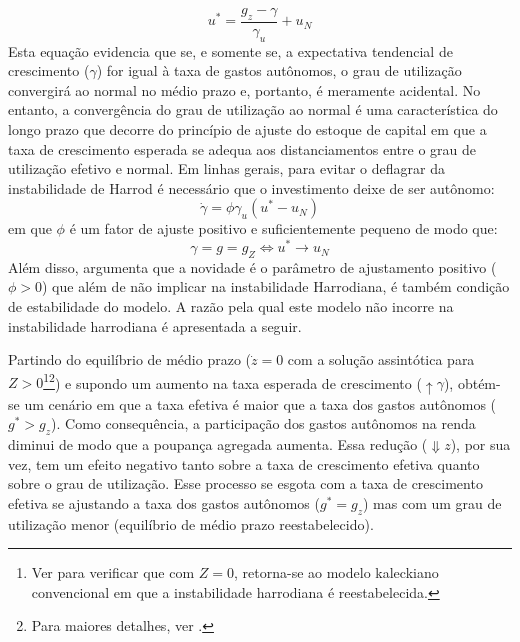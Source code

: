 \begin{equation}
u^* = \frac{g_z - \gamma}{\gamma_u} + u_N
\end{equation}
Esta equação evidencia que se, e somente se, a expectativa tendencial de crescimento ($\gamma$) for igual à taxa de gastos autônomos, o grau de utilização convergirá ao normal no médio prazo e, portanto, é meramente acidental. No entanto, a convergência do grau de utilização ao normal é uma característica do longo prazo que decorre do princípio de ajuste do estoque de capital em que a taxa de crescimento esperada se adequa aos distanciamentos entre o grau de utilização efetivo e normal. Em linhas gerais, para evitar o deflagrar da instabilidade de Harrod é necessário que o investimento deixe de ser autônomo: 
\begin{equation}
\label{eqAllain}
    \dot \gamma = \phi\gamma_u(u^* - u_N)
\end{equation}
em que $\phi$ é um fator de ajuste positivo e suficientemente pequeno de modo que:
$$
\gamma = g = g_Z \Leftrightarrow u^* \to u_N
$$
Além disso, \textcite[p.~14]{allain_macroeconomic_2014} argumenta que a novidade  é o parâmetro  de ajustamento positivo ($\phi > 0$) que além de não implicar na instabilidade Harrodiana, é também condição de estabilidade do modelo. A razão pela qual este modelo não incorre na instabilidade harrodiana é apresentada a seguir.

Partindo do equilíbrio de médio prazo ($\dot z = 0$ com a solução assintótica para $Z >0$\footnote{Ver \textcite[Apêndice A]{allain_macroeconomic_2014} para verificar que com $Z = 0$, retorna-se ao modelo kaleckiano convencional em que a instabilidade harrodiana é reestabelecida.}\footnote{Para maiores detalhes, ver \textcite{fagundes_role_2017}.}) e supondo um aumento na taxa esperada de crescimento ($\uparrow\gamma$), obtém-se um cenário em que a taxa efetiva é maior que a taxa dos gastos autônomos ($g^* > g_z$). Como consequência, a participação dos gastos autônomos na renda diminui de modo que  a poupança agregada aumenta. Essa redução ($\Downarrow z$), por sua vez, tem um efeito negativo tanto sobre a taxa de crescimento efetiva quanto sobre o grau de utilização. Esse processo se esgota com a taxa de crescimento efetiva se ajustando a taxa dos gastos autônomos ($g^* = g_z$) mas com um grau de utilização menor  (equilíbrio de médio prazo reestabelecido). 


